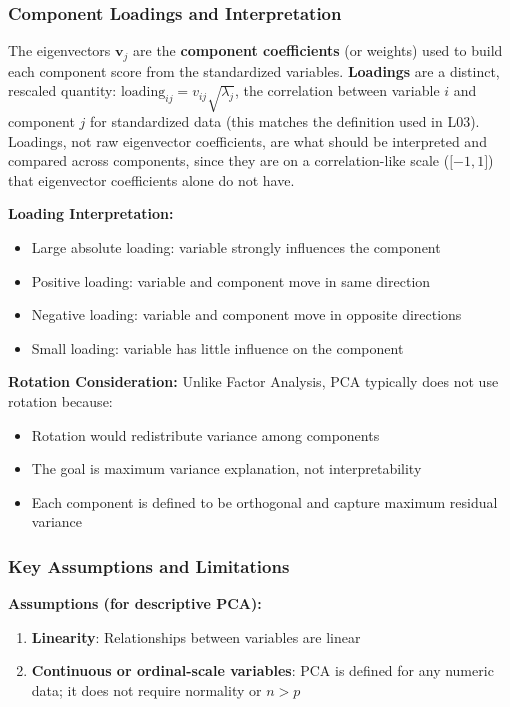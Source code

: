 \documentclass[
]{article}
\begin{document}
\subsubsection{Component Loadings and Interpretation}

The eigenvectors \(\mathbf{v}_{j}\) are the \textbf{component
coefficients} (or weights) used to build each component score from the
standardized variables. \textbf{Loadings} are a distinct, rescaled
quantity: \(\text{loading}_{ij} = v_{ij}\sqrt{\lambda_{j}}\), the
correlation between variable \(i\) and component \(j\) for standardized
data (this matches the definition used in L03). Loadings, not raw
eigenvector coefficients, are what should be interpreted and compared
across components, since they are on a correlation-like scale
(\(\lbrack - 1,1\rbrack\)) that eigenvector coefficients alone do not
have.

\textbf{Loading Interpretation:}

\begin{itemize}
\item
  Large absolute loading: variable strongly influences the component
\item
  Positive loading: variable and component move in same direction
\item
  Negative loading: variable and component move in opposite directions
\item
  Small loading: variable has little influence on the component
\end{itemize}

\textbf{Rotation Consideration:} Unlike Factor Analysis, PCA typically
does not use rotation because:

\begin{itemize}
\item
  Rotation would redistribute variance among components
\item
  The goal is maximum variance explanation, not interpretability
\item
  Each component is defined to be orthogonal and capture maximum
  residual variance
\end{itemize}

\subsubsection{Key Assumptions and Limitations}

\textbf{Assumptions (for descriptive PCA):}

\begin{enumerate}
\item
  \textbf{Linearity}: Relationships between variables are linear
\item
  \textbf{Continuous or ordinal-scale variables}: PCA is defined for any
  numeric data; it does not require normality or \(n > p\)
\end{enumerate}
\end{document}
